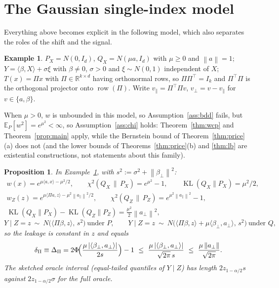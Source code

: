 \documentclass[11pt,a4paper]{article}
\newcommand{\PX}{P_X}
\newcommand{\QX}{Q_X}
\newcommand{\chisq}{\chi^2(\QX\,\|\,\PX)}
\newcommand{\chisqZ}{\chi^2(Q_Z\,\|\,P_Z)}
\newcommand{\norm}[1]{\left\|#1\right\|}
\newcommand{\E}{\mathbb{E}}
\newcommand{\R}{\mathbb{R}}
\newcommand{\KL}{\operatorname{KL}}
\theoremstyle{plain}
\newtheorem{proposition}[theorem]{Proposition}
\theoremstyle{definition}
\newtheorem{example}[theorem]{Example}
\theoremstyle{remark}
\begin{document}
\section{The Gaussian single-index model}\label{sec:gauss}

Everything above becomes explicit in the following model, which also separates the roles of the shift and the signal.

\begin{example}\label{ex:gauss}
$\PX=N(0,I_d)$, $\QX=N(\mu a,I_d)$ with $\mu\ge0$ and $\norm a=1$; $Y=\langle\beta,X\rangle+\sigma\xi$ with $\beta\ne0$, $\sigma>0$ and $\xi\sim N(0,1)$ independent of $X$; $T(x)=\Pi x$ with $\Pi\in\R^{k\times d}$ having orthonormal rows, so $\Pi\Pi^{\!\top}=I_k$ and $\Pi^{\!\top}\Pi$ is the orthogonal projector onto $\operatorname{row}(\Pi)$. Write $v_\parallel=\Pi^{\!\top}\Pi v$, $v_\perp=v-v_\parallel$ for $v\in\{a,\beta\}$.
\end{example}

When $\mu>0$, $w$ is unbounded in this model, so Assumption~\ref{ass:bdd} fails, but $\E_P[w^2]=e^{\mu^2}<\infty$, so Assumption~\ref{ass:chi} holds: Theorem~\ref{thm:wcp} and Theorem~\ref{prop:main} apply, while the Bernstein bound of Theorem~\ref{thm:price}(a) does not (and the lower bounds of Theorems~\ref{thm:price}(b) and \ref{thm:lb} are existential constructions, not statements about this family).

\begin{proposition}\label{prop:gauss}
In Example~\ref{ex:gauss}, with $s^2:=\sigma^2+\norm{\beta_\perp}^2$:
\begin{gather*}
w(x)=e^{\mu\langle a,x\rangle-\mu^2/2},\qquad \chisq=e^{\mu^2}-1,\qquad \KL(\QX\|\PX)=\mu^2/2,\\
w_Z(z)=e^{\mu\langle\Pi a,z\rangle-\mu^2\norm{a_\parallel}^2/2},\qquad \chisqZ=e^{\mu^2\norm{a_\parallel}^2}-1,\\
\KL(\QX\|\PX)-\KL(Q_Z\|P_Z)=\tfrac{\mu^2}{2}\norm{a_\perp}^2,
\end{gather*}
\[
Y\mid Z=z\ \sim\ N\bigl(\langle\Pi\beta,z\rangle,\,s^2\bigr)\ \text{under }P,\qquad
Y\mid Z=z\ \sim\ N\bigl(\langle\Pi\beta,z\rangle+\mu\langle\beta_\perp,a_\perp\rangle,\,s^2\bigr)\ \text{under }Q,
\]
so the leakage is constant in $z$ and equals
\begin{equation}\label{eq:gleak}
\delta_\Pi\equiv\Delta_\Pi=2\Phi\!\Bigl(\frac{\mu\,|\langle\beta_\perp,a_\perp\rangle|}{2s}\Bigr)-1
\ \le\ \frac{\mu\,|\langle\beta_\perp,a_\perp\rangle|}{\sqrt{2\pi}\,s}
\ \le\ \frac{\mu\norm{a_\perp}}{\sqrt{2\pi}} .
\end{equation}
The sketched oracle interval (equal-tailed quantiles of $Y\mid Z$) has length $2z_{1-\alpha/2}s$ against $2z_{1-\alpha/2}\sigma$ for the full oracle.
\end{proposition}
\end{document}

